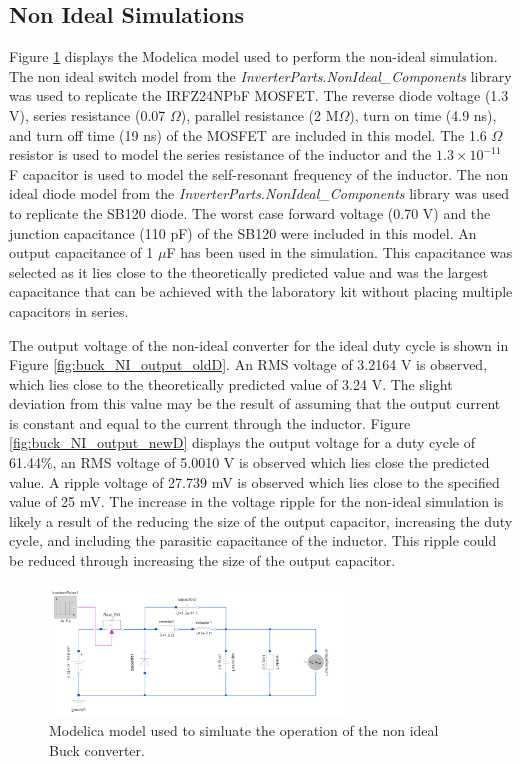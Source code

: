 \documentclass[12pt,twoside]{scrartcl}
\begin{document}
\subsection{Non Ideal Simulations}
Figure \ref{fig:Buck_nonIdealModel} displays the Modelica model used to perform the non-ideal simulation. The non ideal switch model from the \textit{InverterParts}.\textit{NonIdeal\_Components} library was used to replicate the IRFZ24NPbF MOSFET. The reverse diode voltage (1.3 V), series resistance (0.07 $\Omega$), parallel resistance (2 M$\Omega$), turn on time (4.9 ns), and turn off time (19 ns) of the MOSFET are included in this model. The 1.6 $\Omega$ resistor is used to model the series resistance of the inductor and the $1.3\times10^{-11}$ F capacitor is used to model the self-resonant frequency of the inductor. The non ideal diode model from the \textit{InverterParts}.\textit{NonIdeal\_Components} library was used to replicate the SB120 diode. The worst case forward voltage (0.70 V) and the junction capacitance (110 pF) of the SB120 were included in this model. An output capacitance of 1 $\mu$F has been used in the simulation. This capacitance was selected as it lies close to the theoretically predicted value and was the largest capacitance that can be achieved with the laboratory kit without placing multiple capacitors in series. \par
\vspace{5mm}
\noindent The output voltage of the non-ideal converter for the ideal duty cycle is shown in Figure \ref{fig:buck_NI_output_oldD}. An RMS voltage of 3.2164 V is observed, which lies close to the theoretically predicted value of 3.24 V. The slight deviation from this value may be the result of assuming that the output current is constant and equal to the current through the inductor. Figure \ref{fig:buck_NI_output_newD} displays the output voltage for a duty cycle of 61.44\%, an RMS voltage of 5.0010 V is observed which lies close the predicted value. A ripple voltage of 27.739 mV is observed which lies close to the specified value of 25 mV. The increase in the voltage ripple for the non-ideal simulation is likely a result of the reducing the size of the output capacitor, increasing the duty cycle, and including the parasitic capacitance of the inductor. This ripple could be reduced through increasing the size of the output capacitor.\par
\begin{figure}[h]
    \centering
    \includegraphics[width=0.7\textwidth]{Buck_nonIdealModel}
    \caption{Modelica model used to simluate the operation of the non ideal Buck converter.}
    \label{fig:Buck_nonIdealModel}
\end{figure}
\end{document}
